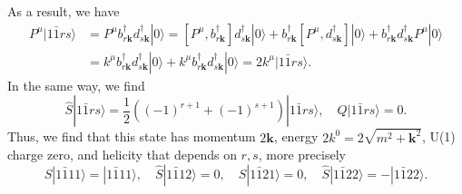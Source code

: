 As a result, we have
\begin{equation}
\begin{aligned}
    P^\mu |1\bar{1}rs\rangle &= P^\mu b^\dagger_{r\mathbf{k}} d^\dagger_{s\mathbf{k}} |0\rangle = [P^\mu, b^\dagger_{r\mathbf{k}}] d^\dagger_{s\mathbf{k}} |0\rangle + b^\dagger_{r\mathbf{k}} [P^\mu, d^\dagger_{s\mathbf{k}}] |0\rangle + b^\dagger_{r\mathbf{k}} d^\dagger_{s\mathbf{k}} P^\mu |0\rangle \\
    &= k^\mu b^\dagger_{r\mathbf{k}} d^\dagger_{s\mathbf{k}} |0\rangle + k^\mu b^\dagger_{r\mathbf{k}} d^\dagger_{s\mathbf{k}} |0\rangle = 2k^\mu |1\bar{1}rs\rangle.
\end{aligned}
\end{equation}
In the same way, we find
\begin{equation}
    \hat{S} |1\bar{1}rs\rangle = \frac{1}{2} \left( (-1)^{r+1} + (-1)^{s+1} \right) |1\bar{1}rs\rangle, \quad Q |1\bar{1}rs\rangle = 0.
\end{equation}
Thus, we find that this state has momentum $2\mathbf{k}$, energy $2k^0 = 2\sqrt{m^2+\mathbf{k}^2}$, U(1) charge zero, and helicity that depends on $r,s$, more precisely
\begin{equation}
    \hat{S} |1\bar{1}11\rangle = |1\bar{1}11\rangle, \quad \hat{S} |1\bar{1}12\rangle = 0, \quad \hat{S} |1\bar{1}21\rangle = 0, \quad \hat{S} |1\bar{1}22\rangle = -|1\bar{1}22\rangle.
\end{equation}